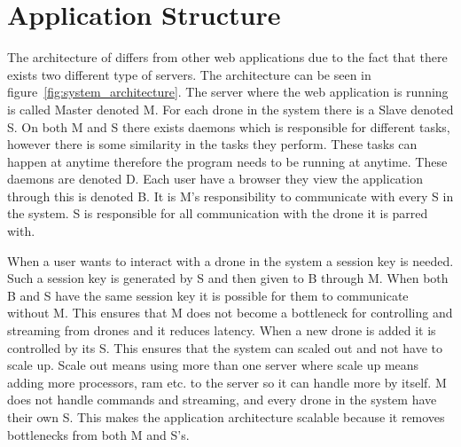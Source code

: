 \section{Application Structure}
\label{sec:application_structure}

The architecture of \projectname{} differs from other web applications due to the fact that there exists two different type of servers. 
The architecture can be seen in figure~\ref{fig:system_architecture}.
The server where the web application is running is called Master denoted M.
For each drone in the system there is a Slave denoted S. 
On both M and S there exists daemons which is responsible for different tasks, however there is some similarity in the tasks they perform. These tasks can happen at anytime therefore the program needs to be running at anytime. These daemons are denoted D.
Each user have a browser they view the application through this is denoted B.
It is M's responsibility to communicate with every S in the system.
S is responsible for all communication with the drone it is parred with.

When a user wants to interact with a drone in the system a session key is needed. Such a session key is generated by S and then given to B through M. When both B and S have the same session key it is possible for them to communicate without M. This ensures that M does not become a bottleneck for controlling and streaming from drones and it reduces latency.
When a new drone is added it is controlled by its S. This ensures that the system can scaled out and not have to scale up. Scale out means using more than one server where scale up means adding more processors, ram etc. to the server so it can handle more by itself.
M does not handle commands and streaming, and every drone in the system have their own S. This makes the application architecture scalable because it removes bottlenecks from both M and S's.

